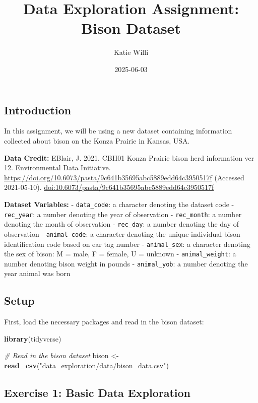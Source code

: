 \documentclass[
]{article}
\title{Data Exploration Assignment: Bison Dataset}
\author{Katie Willi}
\date{2025-06-03}
\newenvironment{Shaded}{\begin{snugshade}}{\end{snugshade}}
\newcommand{\CommentTok}[1]{\textcolor[rgb]{0.56,0.35,0.01}{\textit{#1}}}
\newcommand{\FunctionTok}[1]{\textcolor[rgb]{0.13,0.29,0.53}{\textbf{#1}}}
\newcommand{\NormalTok}[1]{#1}
\newcommand{\OtherTok}[1]{\textcolor[rgb]{0.56,0.35,0.01}{#1}}
\newcommand{\StringTok}[1]{\textcolor[rgb]{0.31,0.60,0.02}{#1}}
\begin{document}
\maketitle

\subsection{Introduction}\label{introduction}

In this assignment, we will be using a new dataset containing
information collected about bison on the Konza Prairie in Kansas, USA.

\textbf{Data Credit:} EBlair, J. 2021. CBH01 Konza Prairie bison herd
information ver 12. Environmental Data Initiative.
\url{https://doi.org/10.6073/pasta/9c641b35695abc5889edd64c3950517f}
(Accessed 2021-05-10).
\url{doi:10.6073/pasta/9c641b35695abc5889edd64c3950517f}

\textbf{Dataset Variables:} - \texttt{data\_code}: a character denoting
the dataset code - \texttt{rec\_year}: a number denoting the year of
observation - \texttt{rec\_month}: a number denoting the month of
observation - \texttt{rec\_day}: a number denoting the day of
observation - \texttt{animal\_code}: a character denoting the unique
individual bison identification code based on ear tag number -
\texttt{animal\_sex}: a character denoting the sex of bison: M = male, F
= female, U = unknown - \texttt{animal\_weight}: a number denoting bison
weight in pounds - \texttt{animal\_yob}: a number denoting the year
animal was born

\subsection{Setup}\label{setup}

First, load the necessary packages and read in the bison dataset:

\begin{Shaded}
\begin{Highlighting}[]
\FunctionTok{library}\NormalTok{(tidyverse)}

\CommentTok{\# Read in the bison dataset}
\NormalTok{bison }\OtherTok{\textless{}{-}} \FunctionTok{read\_csv}\NormalTok{(}\StringTok{"data\_exploration/data/bison\_data.csv"}\NormalTok{)}
\end{Highlighting}
\end{Shaded}

\subsection{Exercise 1: Basic Data
Exploration}\label{exercise-1-basic-data-exploration}
\end{document}

